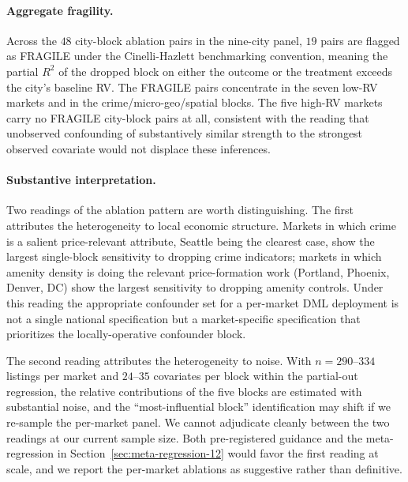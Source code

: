 \paragraph{Aggregate fragility.} Across the $48$ city-block ablation
pairs in the nine-city panel, $19$ pairs are flagged as FRAGILE
under the Cinelli-Hazlett benchmarking convention, meaning the
partial $R^2$ of the dropped block on either the outcome or the
treatment exceeds the city's baseline RV. The FRAGILE pairs
concentrate in the seven low-RV markets and in the
crime/micro-geo/spatial blocks. The five high-RV markets carry no
FRAGILE city-block pairs at all, consistent with the reading that
unobserved confounding of substantively similar strength to the
strongest observed covariate would not displace these inferences.

\paragraph{Substantive interpretation.} Two readings of the ablation
pattern are worth distinguishing. The first attributes the
heterogeneity to local economic structure. Markets in which crime is
a salient price-relevant attribute, Seattle being the clearest case,
show the largest single-block sensitivity to dropping crime
indicators; markets in which amenity density is doing the relevant
price-formation work (Portland, Phoenix, Denver, DC) show the largest
sensitivity to dropping amenity controls. Under this reading the
appropriate confounder set for a per-market DML deployment is not a
single national specification but a market-specific specification
that prioritizes the locally-operative confounder block.

The second reading attributes the heterogeneity to noise. With $n =
290$--$334$ listings per market and $24$--$35$ covariates per block
within the partial-out regression, the relative contributions of the
five blocks are estimated with substantial noise, and the
``most-influential block'' identification may shift if we re-sample
the per-market panel. We cannot adjudicate cleanly between the two
readings at our current sample size. Both pre-registered guidance
and the meta-regression in Section~\ref{sec:meta-regression-12} would
favor the first reading at scale, and we report the per-market
ablations as suggestive rather than definitive.
